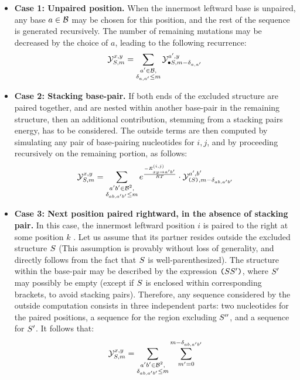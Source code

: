 \begin{itemize}
\item {\bf Case 1: Unpaired position.} When the innermost leftward base is unpaired, any base $a\in\mathcal{B}$ may be chosen for this position, and the rest of the sequence is generated recursively. The number of remaining mutations may be decreased by the choice of $a$, leading to the following recurrence:
\begin{equation}
	\mathcal{Y}_{S, m}^{x,y} = \sum_{\substack{a'\in \mathcal{B},\\ \delta_{a,a'}\le m}}
    \mathcal{Y}_{\bullet S, m- \delta_{a,a'}}^{a',y}
\label{eq:Y_rec_A}
\end{equation}
\item {\bf Case 2: Stacking base-pair.} If both ends of the excluded structure are paired together, and are nested within another base-pair in the remaining structure, then an additional contribution, stemming from a stacking pairs energy, has to be considered. The outside terms are then computed by simulating any pair of base-pairing nucleotides for $i,j$, and by proceeding recursively on the remaining portion, as follows:
\begin{equation}
	\mathcal{Y}_{S, m}^{x,y} = 
    \sum_{\substack{a'b'\in \mathcal{B}^2,\\ \delta_{ab,a'b'}\le m}}
		 e^{\frac{-E^{(i,j)}_{{xy}\to{a'b'}}}{RT}}\cdot
    \mathcal{Y}_{\text{\tt(}S\text{\tt )}, m- \delta_{ab,a'b'}}^{a',b'} 
\label{eq:Y_rec_B}
\end{equation}
\item {\bf Case 3: Next position paired rightward, in the absence of stacking pair.} In this case, the innermost leftward position $i$ is paired to the right at some position $k$ . 
Let us assume that its partner resides outside the excluded structure $S$ (This assumption is provably without loss of generality, and directly follows from the fact that $S$ is well-parenthesized). 
The structure within the base-pair may be described by the expression $\text{\tt(}S S'\text{\tt )}$, where $S'$ may possibly be empty (except if $S$ is enclosed within corresponding brackets, to avoid stacking pairs). Therefore, any sequence considered by the outside computation consists in three independent parts: two nucleotides for the paired positions, a sequence for the region excluding $S''$, and a sequence for $S'$. It follows that:
\begin{equation}
	\Y{\Struct}{m}{x,y} = \sum_{\substack{a'b'\in \B^2,\\ \Kron_{ab,a'b'}\le m}}
		 \sum_{m'=0}^{m-\Kron_{ab,a'b'}}

\end{equation}
\end{itemize}
